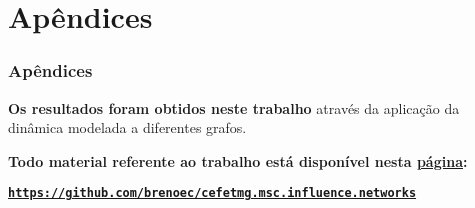 
\section{Apêndices}

\begin{frame}
  \frametitle{Apêndices}

  \textbf{Os resultados foram obtidos neste trabalho} através da aplicação da
    dinâmica modelada a diferentes grafos.
  \vspace{5mm}

  \textbf{Todo material referente ao trabalho está disponível nesta
  \href{https://github.com/brenoec/cefetmg.msc.influence.networks}{página}:}

  \scriptsize{\textbf{\texttt{\href{https://github.com/brenoec/cefetmg.msc.influence.networks}
  {https://github.com/brenoec/cefetmg.msc.influence.networks}}}}

  \vspace{25mm}

\end{frame}

